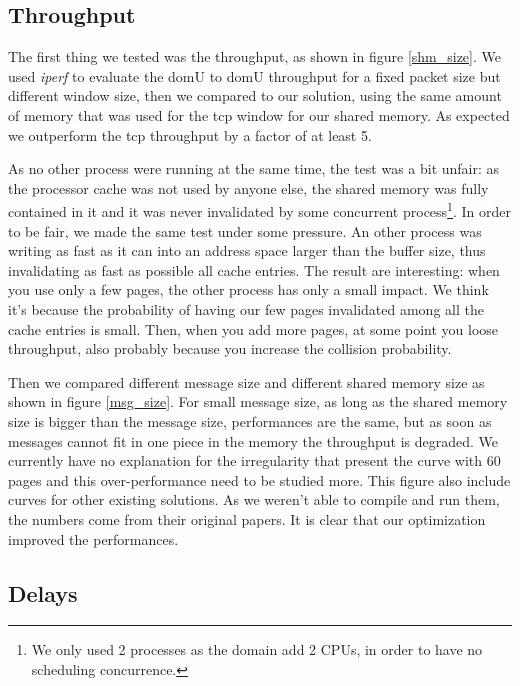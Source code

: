 \documentclass[journal]{IEEEtran}
\begin{document}
\subsection{Throughput}
\label{section:throughput}



The first thing we tested was the throughput, as shown in figure \ref{shm_size}. We used \emph{iperf} to evaluate the domU to domU throughput for a fixed packet size but different window size, then we compared to our solution, using the same amount of memory that was used for the tcp window for our shared memory. As expected we outperform the tcp throughput by a factor of at least 5.



As no other process were running at the same time, the test was a bit unfair: as the processor cache was not used by anyone else, the shared memory was fully contained in it and it was never invalidated by some concurrent process\footnote{We only used 2 processes as the domain add 2 CPUs, in order to have no scheduling concurrence.}. In order to be fair, we made the same test under some pressure. An other process was writing as fast as it can into an address space larger than the buffer size, thus invalidating as fast as possible all cache entries. The result are interesting: when you use only a few pages, the other process has only a small impact. We think it's because the probability of having our few pages invalidated among all the cache entries is small. Then, when you add more pages, at some point you loose throughput, also probably because you increase the collision probability.



Then we compared different message size and different shared memory size as shown in figure \ref{msg_size}. For small message size, as long as the shared memory size is bigger than the message size, performances are the same, but as soon as messages cannot fit in one piece in the memory the throughput is degraded. We currently have no explanation for the irregularity that present the curve with 60 pages and this over-performance need to be studied more. This figure also include curves for other existing solutions. As we weren't able to compile and run them, the numbers come from their original papers. It is clear that our optimization improved the performances.

\subsection{Delays}
\end{document}
